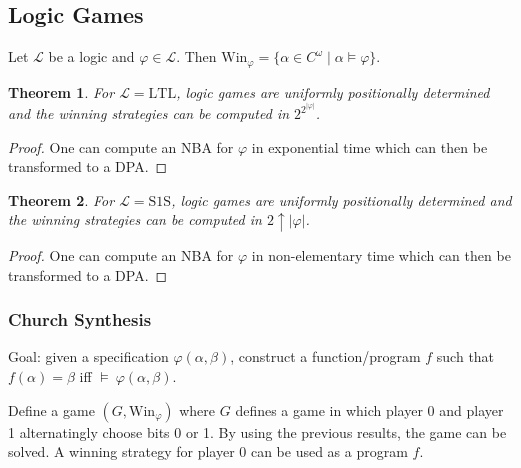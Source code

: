\documentclass{article}
\newtheorem{theorem}{Theorem}
\begin{document}
\subsection{Logic Games}
Let $\mathcal{L}$ be a logic and $\varphi \in \mathcal{L}$. Then $\text{Win}_\varphi = \{ \alpha \in C^\omega \mid \alpha \models \varphi \}$.

\begin{theorem}
	For $\mathcal{L} = \text{LTL}$, logic games are uniformly positionally determined and the winning strategies can be computed in $2^{2^{|\varphi|}}$.
\end{theorem}
\begin{proof}
	One can compute an NBA for $\varphi$ in exponential time which can then be transformed to a DPA.
\end{proof}

\begin{theorem}
	For $\mathcal{L} = \text{S1S}$, logic games are uniformly positionally determined and the winning strategies can be computed in $2 \uparrow |\varphi|$.
\end{theorem}
\begin{proof}
	One can compute an NBA for $\varphi$ in non-elementary time which can then be transformed to a DPA.
\end{proof}

\subsubsection{Church Synthesis}
Goal: given a specification $\varphi(\alpha, \beta)$, construct a function/program $f$ such that $f(\alpha) = \beta $ iff $\models~\varphi(\alpha, \beta)$.

Define a game $(G, \text{Win}_\varphi)$ where $G$ defines a game in which player 0 and player 1 alternatingly choose bits 0 or 1. By using the previous results, the game can be solved. A winning strategy for player 0 can be used as a program $f$.
\end{document}

